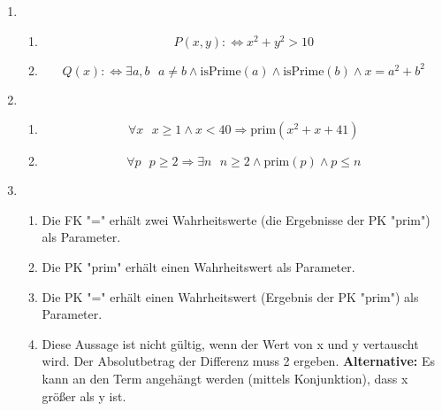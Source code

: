 \documentclass[a4paper]{article}
\begin{document}
\begin{enumerate}
		\item
		\begin{enumerate}
			\item
			\begin{equation*}
				P(x, y) :\Leftrightarrow x^{2} + y^{2} > 10
			\end{equation*}
			
			\item
			\begin{equation*}
				Q(x) :\Leftrightarrow \exists a, b \text{ } a \neq b \land \text{isPrime}(a) \land \text{isPrime}(b) \land x = a^{2} + b^{2}
			\end{equation*}
		\end{enumerate}
		
		\item
		\begin{enumerate}
			\item
			\begin{equation*}
				\forall x \text{ } x \geq 1 \land x < 40 \Rightarrow \text{prim}(x^{2} + x + 41)
			\end{equation*}
			
			\item
			\begin{equation*}
				\forall p \text{ } p \geq 2 \Rightarrow \exists n \text{ } n \geq 2 \land \text{prim}(p) \land p \leq n
			\end{equation*}
		\end{enumerate}
		
		\item
		\begin{enumerate}
			\item Die FK "=" erhält zwei Wahrheitswerte (die Ergebnisse der PK "prim") als Parameter.
			\item Die PK "prim" erhält einen Wahrheitswert als Parameter.
			\item Die PK "=" erhält einen Wahrheitswert (Ergebnis der PK "prim") als Parameter.
			\item Diese Aussage ist nicht gültig, wenn der Wert von x und y vertauscht wird. Der Absolutbetrag der Differenz muss 2 ergeben.
			\newline			
			\textbf{Alternative:} Es kann an den Term angehängt werden (mittels Konjunktion), dass x größer als y ist.
		\end{enumerate}
		

\end{enumerate}
\end{document}
